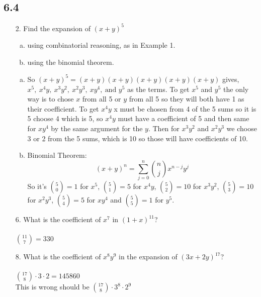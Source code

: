\subsection{6.4}
\begin{itemize}
    \item[2.]  Find the expansion of $(x + y)^5$
          \begin{enumerate}[a.]
              \item using combinatorial reasoning, as in Example 1.
              \item using the binomial theorem.
          \end{enumerate}
          \answer
          \begin{enumerate}[a.]
              \item So $(x+y)^5 = (x+y)(x+y)(x+y)(x+y)(x+y)$ gives, $x^5,\ x^4y,\ x^3y^2,\ x^2y^3,\ xy^4,\ \text{and } y^5$ as the terms. 
              To get $x^5$ and $y^5$ the only way is to chose $x$ from all 5 or $y$ 
              from all 5 so they will both have 1 as their coefficient. To get $x^4y$ 
              x must be chosen from 4 of the 5 sums so it is 5 choose 4 which is 5, 
              so $x^4y$ must have a coefficient of 5 and then same for $xy^4$ by the same
              argument for the $y$. Then for $x^3y^2$ and $x^2y^3$ we choose 3 or 2 from
              the 5 sums, which is 10 so those will have coefficients of 10.
              \item Binomial Theorem:
              \begin{equation*}
                  (x+y)^n = \sum_{j=0}^{n} {n \choose j}x^{n-j}y^j 
              \end{equation*}
              So it's ${5 \choose 0} = 1$ for $x^5$, ${5 \choose 1} = 5$ for $x^4y$, ${5 \choose 2} = 10$ for $x^3y^2$, ${5 \choose 3} = 10$ for $x^2y^3$, 
              ${5 \choose 4} = 5$ for $xy^4$ and ${5 \choose 5} =1$ for $y^5$.
          \end{enumerate}
\item[6.]  What is the coefficient of $x^7$ in $(1 + x)^{11}$? \\
\answer \\
${11 \choose 7} = 330$

\item[8.] What is the coefficient of $x^8y^9$ in the expansion of
$(3x + 2y)^{17}$? \\
\answer \\
${17 \choose 8} \cdot 3 \cdot 2 = 145860$ \\
{\color{red} This is wrong should be ${17 \choose 8} \cdot 3^8 \cdot 2^9 $}


\end{itemize}
